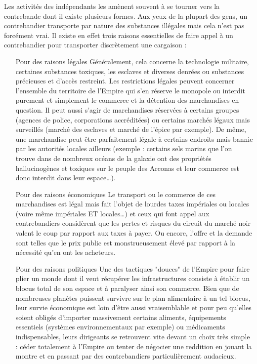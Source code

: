 \documentclass[twoside]{article}
\begin{document}
Les activités des indépendants les amènent souvent à se tourner vers la contrebande dont il existe plusieurs formes. Aux yeux de la plupart des gens, un contrebandier transporte par nature des substances illégales mais cela n'est pas forcément vrai. Il existe en effet trois raisons essentielles de faire appel à un contrebandier pour transporter discrètement une cargaison :
\begin{itemize}
	\item[Pour des raisons légales] Généralement, cela concerne la technologie militaire, certaines substances toxiques, les esclaves et diverses denrées ou substances précieuses et d'accès restreint. Les restrictions légales peuvent concerner l'ensemble du territoire de l'Empire qui s'en réserve le monopole ou interdit purement et simplement le commerce et la détention des marchandises en question. Il peut aussi s'agir de marchandises réservées à certains groupes (agences de police, corporations accréditées) ou certains marchés légaux mais surveillés (marché des esclaves et marché de l'épice par exemple).  De même, une marchandise peut être parfaitement légale à certains endroits mais bannie par les autorités locales ailleurs (exemple : certains sels marins que l'on trouve dans de nombreux océans de la galaxie ont des propriétés hallucinogènes et toxiques sur le peuple des Arconas et leur commerce est donc interdit dans leur espace\ldots).
	\item[Pour des raisons économiques] Le transport ou le commerce de ces marchandises est légal mais fait l'objet de lourdes taxes impériales ou locales (voire même impériales ET locales\ldots) et ceux qui font appel aux contrebandiers considèrent que les pertes et risques du circuit du marché noir valent le coup par rapport aux taxes à payer. Ou encore, l'offre et la demande sont telles que le prix public est monstrueusement élevé par rapport à la nécessité qu'en ont les acheteurs.
	\item[Pour des raisons politiques] Une des tactiques "douces" de l'Empire pour faire plier un monde dont il veut récupérer les infrastructures consiste à établir un blocus total de son espace et à paralyser ainsi son commerce. Bien que de nombreuses planètes puissent survivre sur le plan alimentaire à un tel blocus, leur survie économique est loin d'être aussi vraisemblable et pour peu qu'elles soient obligés d'importer massivement certains aliments, équipements essentiels (systèmes environnementaux par exemple) ou médicaments indispensables, leurs dirigeants se retrouvent vite devant un choix très simple : céder totalement à l'Empire ou tenter de négocier une reddition en jouant la montre et en passant par des contrebandiers particulièrement audacieux. 
\end{itemize}
\end{document}
